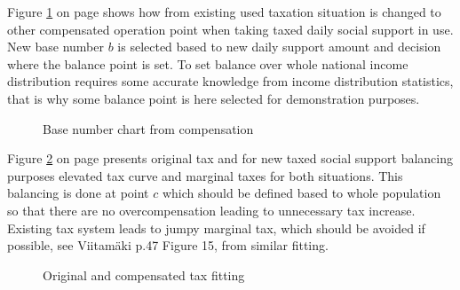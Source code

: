 Figure \ref{fig:B2b1cris} on page \pageref{fig:B2b1cris}
shows how from existing used taxation situation is changed to other compensated operation point
when taking taxed daily social support in use.
New base number $b$ is selected based to new daily support amount
and decision where the balance point is set.
To set balance over whole national income distribution requires some accurate knowledge
from income distribution statistics,
that is why some balance point is here selected for demonstration purposes.
\begin{figure} %
 \begin{center}
  \caption{Base number chart from compensation}
  \label{fig:B2b1cris} 
 \end{center}
\end{figure}

Figure \ref{fig:BaseComp} on page \pageref{fig:BaseComp} presents original tax
and for new taxed social support balancing purposes elevated tax curve
and marginal taxes for both situations.
This balancing is done at point $c$ which should be defined based to whole population
so that there are no overcompensation leading to unnecessary tax increase.
Existing tax system leads to jumpy marginal tax, which should be avoided if possible,
see Viitam\"aki\cite{VM_46_2019} p.47 Figure 15, from similar fitting.
\begin{figure} %
 \begin{center}
  \caption{Original and compensated tax fitting}
  \label{fig:BaseComp} 
 \end{center}
\end{figure}

